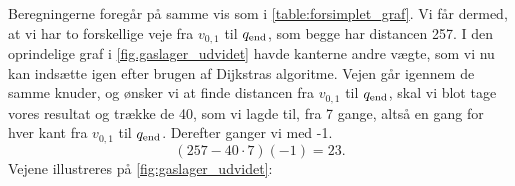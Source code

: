  


Beregningerne foregår på samme vis som i \autoref{table:forsimplet_graf}. Vi får dermed, at vi har to forskellige veje fra $v_{0,1}$ til $q_{\textrm{end}}$, som begge har distancen 257. I den oprindelige graf i \autoref{fig.gaslager_udvidet} havde kanterne andre vægte, som vi nu kan indsætte igen efter brugen af Dijkstras algoritme. Vejen går igennem de samme knuder, og ønsker vi at finde distancen fra $v_{0,1}$ til $q_{\textrm{end}}$, skal vi blot tage vores resultat og trække de 40, som vi lagde til, fra 7 gange, altså en gang for hver kant fra $v_{0,1}$ til $q_{\textrm{end}}$. Derefter ganger vi med -1.
\begin{equation}
(257-40 \cdot 7)(-1) = 23.
\end{equation}
Vejene illustreres på \autoref{fig:gaslager_udvidet}:



